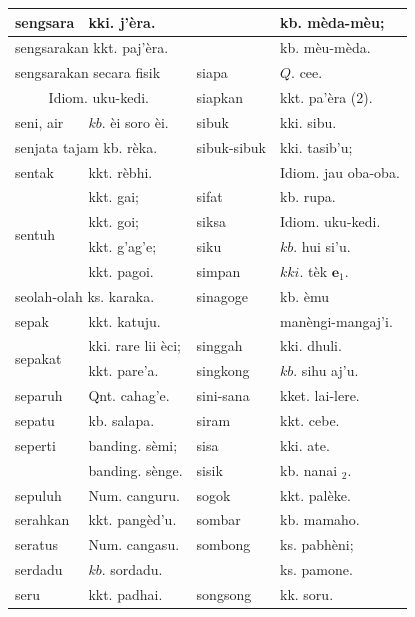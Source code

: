 \documentclass[10pt]{article}
\begin{document}
\begin{center}
\begin{tabular}{|l|l|l|l|}
\hline
sengsara & kki. j'èra. &  & kb. mèda-mèu; \\
\hline
\multicolumn{2}{|l|}{sengsarakan kkt. paj'èra.} &  & kb. mèu-mèda. \\
\hline
\multicolumn{2}{|l|}{sengsarakan secara fisik} & siapa & \(Q\). cee. \\
\hline
\multicolumn{2}{|c|}{Idiom. uku-kedi.} & siapkan & kkt. pa'èra (2). \\
\hline
seni, air & \(k b\). èi soro èi. & sibuk & kki. sibu. \\
\hline
\multicolumn{2}{|l|}{senjata tajam kb. rèka.} & sibuk-sibuk & kki. tasib'u; \\
\hline
sentak & kkt. rèbhi. &  & Idiom. jau oba-oba. \\
\hline
\multirow[t]{4}{*}{sentuh} & kkt. gai; & sifat & kb. rupa. \\
\hline
 & kkt. goi; & siksa & Idiom. uku-kedi. \\
\hline
 & kkt. g'ag'e; & siku & \(k b\). hui si'u. \\
\hline
 & kkt. pagoi. & simpan & \(k k i\). tèk \(\mathbf{e}_{1}\). \\
\hline
\multicolumn{2}{|l|}{seolah-olah ks. karaka.} & sinagoge & kb. èmu \\
\hline
sepak & kkt. katuju. &  & manèngi-mangaj'i. \\
\hline
\multirow[t]{2}{*}{sepakat} & kki. rare lii èci; & singgah & kki. dhuli. \\
\hline
 & kkt. pare'a. & singkong & \(k b\). sihu aj'u. \\
\hline
separuh & Qnt. cahag'e. & sini-sana & kket. lai-lere. \\
\hline
sepatu & kb. salapa. & siram & kkt. cebe. \\
\hline
seperti & banding. sèmi; & sisa & kki. ate. \\
\hline
 & banding. sènge. & sisik & kb. nanai \({ }_{2}\). \\
\hline
sepuluh & Num. canguru. & sogok & kkt. palèke. \\
\hline
serahkan & kkt. pangèd'u. & sombar & kb. mamaho. \\
\hline
seratus & Num. cangasu. & sombong & ks. pabhèni; \\
\hline
serdadu & \(k b\). sordadu. &  & ks. pamone. \\
\hline
seru & kkt. padhai. & songsong & kk. soru. \\

\end{tabular}
\end{center}
\end{document}
